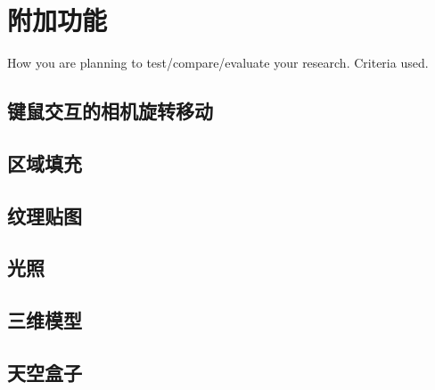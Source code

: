 

    \chapter{附加功能}

    How you are planning to test/compare/evaluate your research.
    Criteria used.
	\section{键鼠交互的相机旋转移动}
    \section{区域填充}

    \section{纹理贴图}
    
    \section{光照}
    
    \section{三维模型}
    
    \section{天空盒子}


